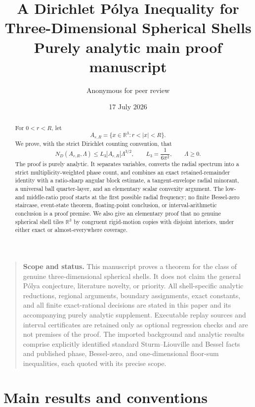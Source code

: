 \documentclass[11pt]{article}
\title{A Dirichlet P\'olya Inequality for\\Three-Dimensional Spherical Shells\\[0.4em]
\large Purely analytic main proof manuscript}
\author{Anonymous for peer review}
\date{17 July 2026}
\numberwithin{equation}{section}
\theoremstyle{definition}
\theoremstyle{remark}
\newcommand{\R}{\mathbb R}
\begin{document}
\maketitle
\thispagestyle{titlepage}

\begin{quote}
\small
\textbf{Scope and status.}
This manuscript proves a theorem for the class of genuine three-dimensional
spherical shells.  It does not claim the general P\'olya conjecture,
literature novelty, or priority.  All shell-specific analytic reductions,
regional arguments, boundary assignments, exact constants, and all finite
exact-rational decisions are stated in this paper and its accompanying
purely analytic supplement.  Executable replay sources and interval
certificates are retained only as optional regression checks and are not
premises of the proof.  The imported background and analytic results
comprise explicitly identified standard Sturm--Liouville and Bessel facts and
published phase, Bessel-zero, and one-dimensional floor-sum inequalities,
each quoted with its precise scope.
\end{quote}

\begin{abstract}
For \(0<r<R\), let
\[
  A_{r,R}=\{x\in\R^3:r<|x|<R\}.
\]
We prove, with the strict Dirichlet counting convention, that
\[
  N_D(A_{r,R},\Lambda)
  \le L_3|A_{r,R}|\Lambda^{3/2},
  \qquad
  L_3=\frac1{6\pi^2},
  \qquad \Lambda\ge0.
\]
The proof is purely analytic.  It separates variables, converts the radial
spectrum into a strict multiplicity-weighted phase count, and combines an
exact retained-remainder identity with a ratio-sharp angular block estimate,
a tangent-envelope radial minorant, a universal ball quarter-layer, and an
elementary scalar convexity argument.  The low- and middle-ratio proof starts
at the first possible radial frequency; no finite Bessel-zero staircase,
event-state theorem, floating-point conclusion, or interval-arithmetic
conclusion is a proof premise.  We also give an elementary proof that no genuine spherical
shell tiles \(\R^3\) by congruent rigid-motion copies with disjoint interiors,
under either exact or almost-everywhere coverage.
\end{abstract}

\tableofcontents
\clearpage

\section{Main results and conventions}
\end{document}
